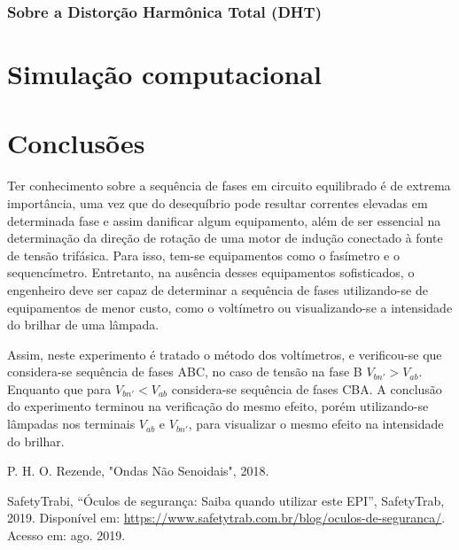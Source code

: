 \documentclass[a4paper,12pt,oneside,openany,table,xcdraw]{article}
\begin{document}
\subsubsection{Sobre a Distorção Harmônica Total (DHT)}



\vspace{1cm}
\section{Simulação computacional} %

\vspace{2cm}
\section{Conclusões} %
Ter conhecimento sobre a sequência de fases em circuito equilibrado é de extrema importância, uma vez que do desequíbrio pode resultar correntes elevadas em determinada fase e assim danificar algum equipamento, além de ser essencial na determinação da direção de rotação de uma motor de indução
conectado à fonte de tensão trifásica. Para isso, tem-se equipamentos como o fasímetro e o sequencímetro. Entretanto, na ausência desses equipamentos sofisticados, o engenheiro deve ser capaz de determinar a sequência de fases utilizando-se de equipamentos de menor custo, como o voltímetro ou visualizando-se a intensidade do brilhar de uma lâmpada.

Assim, neste experimento é tratado o método dos voltímetros, e verificou-se que considera-se sequência de fases ABC, no caso de tensão na fase B $V_{bn'}>V_{ab}$. Enquanto que para $V_{bn'}<V_{ab}$ considera-se sequência de fases CBA. A conclusão do experimento terminou na verificação do mesmo efeito, porém utilizando-se lâmpadas nos terminais $V_{ab}$ e $V_{bn'}$, para visualizar o mesmo efeito na intensidade do brilhar.

\newpage
\begin{thebibliography}{9} 
    P. H. O. Rezende,
    "Ondas Não Senoidais", 2018.

    SafetyTrabi,
    “Óculos de segurança: Saiba quando utilizar este EPI”, SafetyTrab, 2019.
 Disponível em:
 \url{https://www.safetytrab.com.br/blog/oculos-de-seguranca/}. Acesso em: ago. 2019.

\end{thebibliography}
\end{document}
